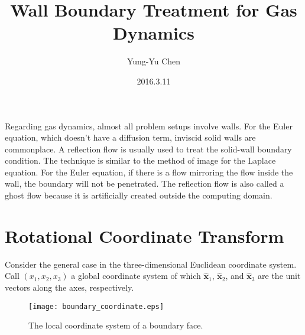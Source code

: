 \documentclass[a4paper,12pt,dvips]{article}
\begin{document}
\title{Wall Boundary Treatment for Gas Dynamics}
\author{Yung-Yu Chen}
\date{2016.3.11}

\maketitle

\tableofcontents

\hspace{.5cm}

Regarding gas dynamics, almost all problem setups involve walls.  For the Euler
equation, which doesn't have a diffusion term, inviscid solid walls are
commonplace.  A reflection flow is usually used to treat the solid-wall
boundary condition\cite{laney_computational_1998}.  The technique is similar to
the method of image for the Laplace equation.  For the Euler equation, if there
is a flow mirroring the flow inside the wall, the boundary will not be
penetrated.  The reflection flow is also called a ghost flow because it is
artificially created outside the computing domain.

\section{Rotational Coordinate Transform}

Consider the general case in the three-dimensional Euclidean coordinate system.
Call $(x_1, x_2, x_3)$ a global coordinate system of which
%
$\hat{\mathbf{x}}_1$, $\hat{\mathbf{x}}_2$, and $\hat{\mathbf{x}}_3$
%
are the unit vectors along the axes, respectively.

\begin{figure}[htbp]
\centering
\texttt{[image: boundary\_coordinate.eps]}
\caption{The local coordinate system of a boundary face.}
\label{f:boundary_coordinate}
\end{figure}
\end{document}
